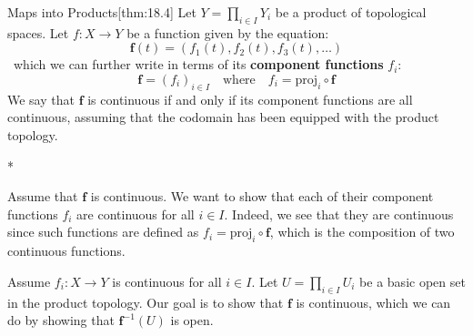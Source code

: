 \begin{thmBox}{Maps into Products}[thm:18.4]
    Let \( Y = \prod_{ i \in I } Y_{ i } \) be a product of topological spaces.
    Let \( f: X \rightarrow Y \) be a function given by the equation:
    \begin{equation*}
        \mathbf{f} ( t )
        =
        ( f_{ 1 } ( t ), f_{ 2 } ( t ), f_{ 3 } ( t ), \ldots )
    \end{equation*}\
    which we can further write in terms of its \textbf{component functions}
    \( f_{ i } \):
    \begin{equation*}
        \mathbf{f} = ( f_{ i } )_{ i \in I }
        \quad \mathrm{where} \quad 
        f_{ i } = \mathrm{proj}_{ i } \circ \mathbf{f}
    \end{equation*}
    We say that \( \mathbf{f} \) is continuous if and only if its component 
    functions are all continuous, assuming that the codomain has been equipped 
    with the product topology.

    \baseRule

    \begin{proofBox}*
        \wrapBox{\( \implies \)} 

        Assume that \( \mathbf{f} \) is continuous.
        We want to show that each of their component functions \( f_{ i } \) are
        continuous for all \( i \in I \).
        Indeed, we see that they are continuous since such functions are defined
        as \( f_{ i } = \mathrm{proj}_{ i } \circ \mathbf{f} \), which is the 
        composition of two continuous functions.

        \baseSkip

        \wrapBox{\( \impliedby \)}

        Assume \( f_{ i } : X \rightarrow Y \) is continuous for all 
        \( i \in I \).
        Let \( U = \prod_{ i \in I } U_{ i } \) be a basic open set in the 
        product topology.
        Our goal is to show that \( \mathbf{f} \) is continuous, which we can 
        do by showing that \( \mathbf{f}^{ -1 } ( U ) \) is open.

        \baseSkip 


\end{proofBox}
\end{thmBox}

